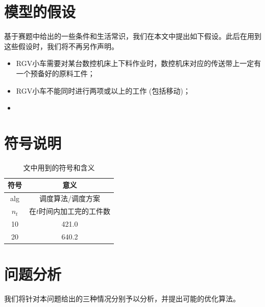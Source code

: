 \documentclass{cumcmthesis}
\begin{document}
	\section{模型的假设}
	基于赛题中给出的一些条件和生活常识，我们在本文中提出如下假设。此后在用到这些假设时，我们将不再另作声明。
	\begin{itemize}
	\item RGV小车需要对某台数控机床上下料作业时，数控机床对应的传送带上一定有一个预备好的原料工件；
	\item RGV小车不能同时进行两项或以上的工作 (包括移动)；
	\item 
	\end{itemize}
	
	
	\section{符号说明}
	\begin{table}[!htbp]
		\centering
		\begin{tabular}{cc}
		\toprule[1.5pt]
		符号 & 意义\\
		\midrule[1pt]
		alg     & 调度算法/调度方案 \\
		\(n_t\) & 在$t$时间内加工完的工件数  \\
		10 & 421.0 \\
		20 & 640.2 \\
		\bottomrule[1.5pt]
		\end{tabular}
		\caption{文中用到的符号和含义}\label{fuHaoShuoMing}
	\end{table}
	
	\section{问题分析}
	我们将针对本问题给出的三种情况分别予以分析，并提出可能的优化算法。
\end{document}

